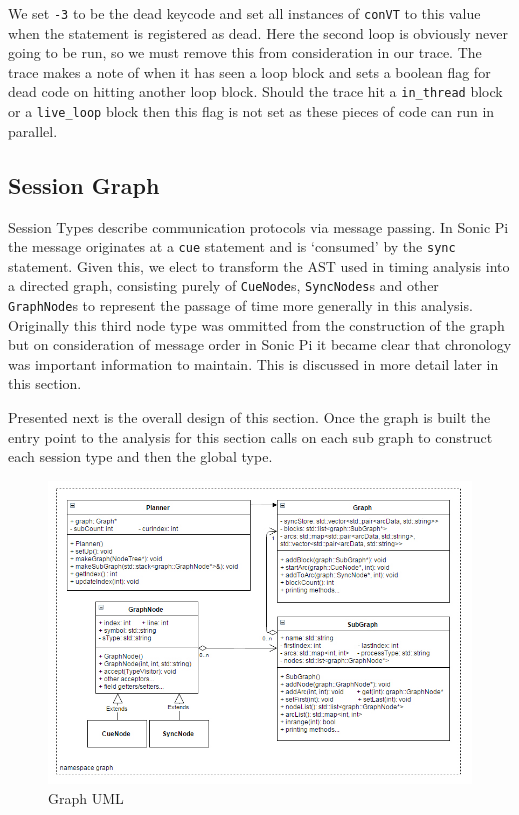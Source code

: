 \documentclass[11pt, abstracton, twoside, titlepage=true]{scrartcl}
\begin{document}
We set \texttt{-3} to be the dead keycode and set all instances of \texttt{conVT} 
to this value when the statement is registered as dead. Here the second loop is 
obviously never going to be run, so we must remove this from consideration in our
trace. The trace makes a note of when it has seen a loop block and sets a boolean 
flag for dead code on hitting another loop block. Should the trace hit a 
\texttt{in\_thread} block or a \texttt{live\_loop} block then this flag is not set 
as these pieces of code can run in parallel.

\subsection{Session Graph}
Session Types describe communication protocols via message passing. In Sonic Pi
the message originates at a \texttt{cue} statement and is `consumed' by the
\texttt{sync} statement. Given this, we elect to transform the AST used in
timing analysis into a directed graph, consisting purely of \texttt{CueNode}s,
\texttt{SyncNodes}s and other \texttt{GraphNode}s to represent the passage
of time more generally in this analysis. Originally this third node type
was ommitted from the construction of the graph but on consideration of
message order in Sonic Pi it became clear that chronology was important 
information to maintain. This is discussed in more detail later in this section.

Presented next is the overall design of this section. Once the graph is
built the entry point to the analysis for this section calls on each sub 
graph to construct each session type and then the global type.

\begin{figure}[h!]
	\centering
	\includegraphics[width=\textwidth]{images/session.jpg}
	\caption{Graph UML} \label{graphUML}
\end{figure}
\end{document}
